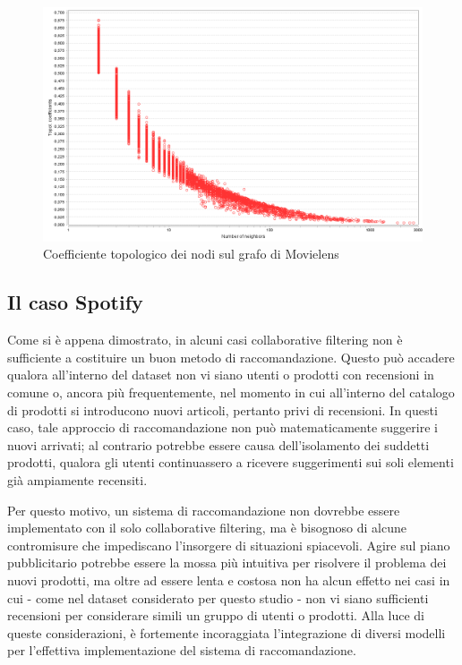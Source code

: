 \documentclass[hidelinks, 12pt]{article}
\begin{document}
\begin{figure}[H]
\centering
\includegraphics[scale=0.25]{images/07_08_topological_movielens.png}
\caption[Coefficiente topologico dei nodi sul grafo di Movielens]{Coefficiente topologico dei nodi sul grafo di Movielens}
\label{fig:topol-coeff-movielens}
\end{figure}



\subsection{Il caso Spotify}
\label{sec:spotify}

Come si è appena dimostrato, in alcuni casi collaborative filtering non è sufficiente a costituire un buon metodo di raccomandazione. Questo può accadere qualora all'interno del dataset non vi siano utenti o prodotti con recensioni in comune o, ancora più frequentemente, nel momento in cui all'interno del catalogo di prodotti si introducono nuovi articoli, pertanto privi di recensioni. In questi caso, tale approccio di raccomandazione non può matematicamente suggerire i nuovi arrivati; al contrario potrebbe essere causa dell'isolamento dei suddetti prodotti, qualora gli utenti continuassero a ricevere suggerimenti sui soli elementi già ampiamente recensiti.

Per questo motivo, un sistema di raccomandazione non dovrebbe essere implementato con il solo collaborative filtering, ma è bisognoso di alcune contromisure che impediscano l'insorgere di situazioni spiacevoli. Agire sul piano pubblicitario potrebbe essere la mossa più intuitiva per risolvere il problema dei nuovi prodotti, ma oltre ad essere lenta e costosa non ha alcun effetto nei casi in cui - come nel dataset considerato per questo studio - non vi siano sufficienti recensioni per considerare simili un gruppo di utenti o prodotti. Alla luce di queste considerazioni, è fortemente incoraggiata l'integrazione di diversi modelli per l'effettiva implementazione del sistema di raccomandazione.
\end{document}
